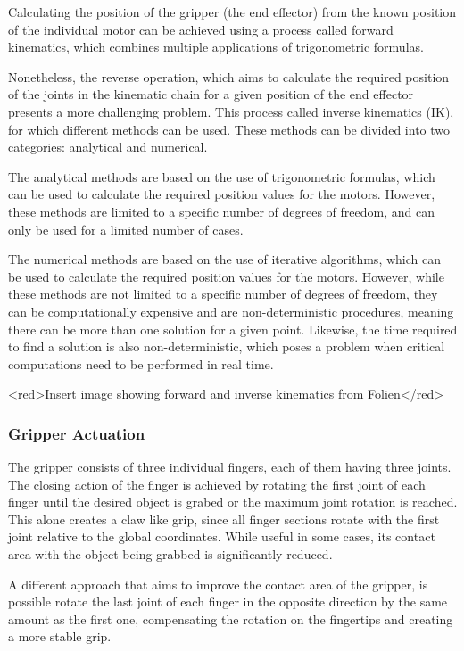 Calculating the position of the gripper (the end effector) from the known position of the individual motor can be achieved using a process called forward kinematics, which combines multiple applications of trigonometric formulas.

Nonetheless, the reverse operation, which aims to calculate the required position of the joints in the kinematic chain for a given position of the end effector presents a more challenging problem. 
This process called inverse kinematics (IK), for which different methods can be used. These methods can be divided into two categories: analytical and numerical.

The analytical methods are based on the use of trigonometric formulas, which can be used to calculate the required position values for the motors. However, these methods are limited to a specific number of degrees of freedom, and can only be used for a limited number of cases.

The numerical methods are based on the use of iterative algorithms, which can be used to calculate the required position values for the motors. However, while these methods are not limited to a specific number of degrees of freedom, they can be computationally expensive and are non-deterministic procedures, meaning there can be more than one solution for a given point. Likewise, the time required to find a solution is also non-deterministic, which poses a problem when critical computations need to be performed in real time.

<red>Insert image showing forward and inverse kinematics from Folien</red>


\subsubsection{Gripper Actuation}

The gripper consists of three individual fingers, each of them having three joints. The closing action of the finger is achieved by rotating the first joint of each finger until the desired object is grabed or the maximum joint rotation is reached. This alone creates a claw like grip, since all finger sections rotate with the first joint relative to the global coordinates. While useful in some cases, its contact area with the object being grabbed is significantly reduced.

A different approach that aims to improve the contact area of the gripper, is possible rotate the last joint of each finger in the opposite direction by the same amount as the first one, compensating the rotation on the fingertips and creating a more stable grip.

